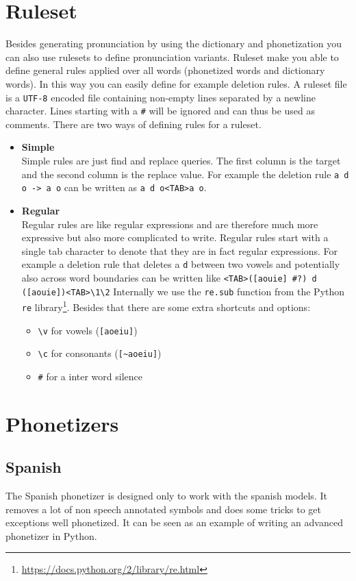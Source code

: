 \section{Ruleset}
Besides generating pronunciation by using the dictionary and phonetization you
can also use rulesets to define pronunciation variants. Ruleset make you able
to define general rules applied over all words (phonetized words and dictionary
words). In this way you can easily define for example deletion rules.
A ruleset file is a \texttt{UTF-8} encoded file containing non-empty lines
separated by a newline character. Lines starting with a \texttt{\#} will be
ignored and can thus be used as comments. There are two ways of defining rules
for a ruleset.
\begin{itemize}
	\item \textbf{Simple}\\
		Simple rules are just find and replace queries. The first column is the
		target and the second column is the replace value. For example the deletion
		rule \texttt{a d o -> a o} can be written as \texttt{a d o<TAB>a o}.
	\item \textbf{Regular}\\
		Regular rules are like regular expressions and are therefore much more
		expressive but also more complicated to write. Regular rules start with a
		single tab character to denote that they are in fact regular expressions.
		For example a deletion rule that deletes a \texttt{d} between two vowels
		and potentially also across word boundaries can be written like
		\verb|<TAB>([aouie] #?) d ([aouie])<TAB>\1\2|
		Internally we use the \texttt{re.sub} function from the Python \texttt{re}
		library\footnote{\url{https://docs.python.org/2/library/re.html}}. Besides
		that there are some extra shortcuts and options:
		\begin{itemize}
			\item \verb|\v| for vowels (\verb|[aoeiu]|)
			\item \verb|\c| for consonants (\verb|[~aoeiu]|)
			\item \verb|#| for a inter word silence
		\end{itemize}
\end{itemize}


\section{Phonetizers}\label{sec:phonetizers}
\subsection{Spanish}
The Spanish phonetizer is designed only to work with the spanish models. It
removes a lot of non speech annotated symbols and does some tricks to get
exceptions well phonetized. It can be seen as an example of writing an advanced
phonetizer in Python.

